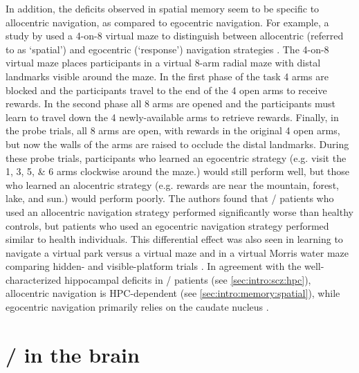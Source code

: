 In addition, the deficits observed in spatial memory seem to be specific to allocentric navigation, as compared to egocentric navigation.
For example, a study by \citeauthor{Wilkins2013} used a 4-on-8 virtual maze to distinguish between allocentric (referred to as `spatial') and egocentric (`response') navigation strategies \citep{Wilkins2013}.
The 4-on-8 virtual maze places participants in a virtual 8-arm radial maze with distal landmarks visible around the maze.
In the first phase of the task 4 arms are blocked and the participants travel to the end of the 4 open arms to receive rewards.
In the second phase all 8 arms are opened and the participants must learn to travel down the 4 newly-available arms to retrieve rewards.
Finally, in the probe trials, all 8 arms are open, with rewards in the original 4 open arms, but now the walls of the arms are raised to occlude the distal landmarks.
During these probe trials, participants who learned an egocentric strategy (e.g. visit the 1, 3, 5, \& 6 arms clockwise around the maze.) would still perform well, but those who learned an alocentric strategy (e.g. rewards are near the mountain, forest, lake, and sun.) would perform poorly.
The authors found that \scz/ patients who used an allocentric navigation strategy performed significantly worse than healthy controls, but patients who used an egocentric navigation strategy performed similar to health individuals.
This differential effect was also seen in learning to navigate a virtual park versus a virtual maze \citep{Weniger2008} and in a virtual Morris water maze comparing hidden- and visible-platform trials \citep{Hanlon2006}.
In agreement with the well-characterized hippocampal deficits in \scz/ patients (see \autoref{sec:intro:scz:hpc}), allocentric navigation is \acs{HPC}-dependent (see \autoref{sec:intro:memory:spatial}), while egocentric navigation primarily relies on the caudate nucleus \citep{Hartley2003}.

\section{\Scz/ in the brain}\label{sec:intro:scz:brain}


